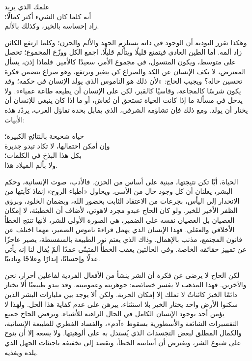 \begin{SourceQuotation}
علمك الذي يريد\\
أنه كلما كان الشيء أكثر كمالًا؛\\
زاد إحساسه بالخير، وكذلك بالألم.
\end{SourceQuotation}

وهكذا تقرر البوذية أن الوجود في ذاته يستلزم الجهد والألم والحزن؛ وكلما ارتفع الكائن زاد ألمه. أما الطين العادي فيتمتع قليلًا ويتألم قليلًا. اجمع الكل ووزّع المجموع؛ تحصل على متوسط، ويكون المتسول، في مجموع الأمر، سعيدًا كالأمير. فلماذا إذن، يسأل المعترض، لا يكف الإنسان عن الكد والصراع كي يتغير ويرتفع، وهو صراع يتضمن فكرة تحسين حاله؟ ويجيب الحاج: «لأن ذلك هو الناموس الذي يولد الإنسان في حكمه؛ وقد يكون شرسًا كالمجاعة، وقاسيًا كالقبر، لكن على الإنسان أن يطيعه طاعة عمياء». ولا يدخل في مسألة ما إذا كانت الحياة تستحق أن تُعاش، أو ما إذا كان ينبغي للإنسان أن يختار أن يولد. ومع ذلك فإن تشاؤمه الشرقي، الذي يقابل بحدة تفاؤل الغرب، يردّد هذه الأبيات:

\begin{SourceQuotation}
حياة شحيحة بالنتائج الكبيرة؛\\
وإن أمكن احتمالها، لا تكاد تبدو جديرة\\
بكل هذا البذخ في الكلمات؛\\
ولا بألم الميلاد هذا.
\end{SourceQuotation}

الحياة، أيًا تكن نتيجتها، مبنية على أساس من الحزن. فالأدب، صوت الإنسانية، وحكم البشر، يعلنان أن كل وجود حال من الأسى. ويحاول «أطباء الروح» إنقاذ كآبتها من الانحدار إلى اليأس، بجرعات من الاعتقاد الثابت بحضور الله، وبضمان الخلود، وبرؤى الظفر الأخير للخير. ولو كان الحاج عبدو مجرد لاهوتي، لأضاف أن الخطيئة، لا إمكان العصيان بل العصيان نفسه على الضمير، هي الصورة الأولى للشر، لأنها تنتج الخطأ الأخلاقي والعقلي. فهذا الإنسان الذي يهمل قراءة ناموس الضمير، مهما اختلف عن قانون المجتمع، مذنب بالإهمال. وذاك الذي يعتم نور الطبيعة بالسفسطة، يصير عاجزًا عن تمييز حقائقه الخاصة. وفي الحالتين يعقب الخطأَ المتبنّى عمدًا ألمٌ يُقال لنا إنه يأتي عدلًا وإحسانًا، إنذارًا وعلاجًا وتأديبًا.

لكن الحاج لا يرضى عن فكرة أن الشر ينشأ من الأفعال الفردية لفاعلين أحرار، نحن والآخرين. فهذا المذهب لا يفسر خصائصه: جوهريته وعموميته. وقد يبدو طبيعيًا ألا تختار دائمًا الخيرَ كائناتٌ لا تملك إلا إمكان الحرية. ولكن ألا يوجد بين مليارات البشر الذين سكنوا الأرض واحد يختار الخير بلا استثناء، يبرهن على عدم كفاية هذا الحل. ولهذا لا يؤمن أحد بوجود الإنسان الكامل في الحال الراهنة للأشياء. ويرفض الحاج جميع التفسيرات الشائعة والأسطورية بسقوط «آدم»، والفساد الفطري للطبيعة الإنسانية، والكمال المطلق لبعض التجسدات الذي يُستدل به على ألوهيتها. ولا يسعه إلا أن ينوح على شيوع الشر، ويفترض أن أساسه الخطأ، ويقصد إلى تخفيفه باجتثاث الجهل الذي يلده ويغذيه.

